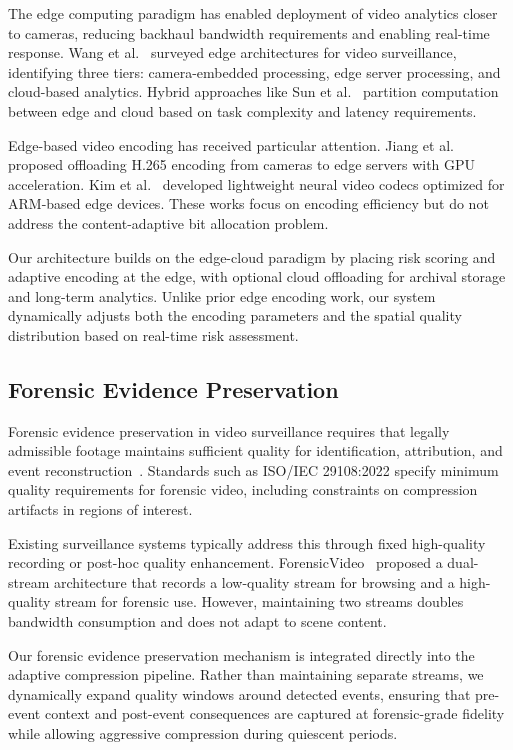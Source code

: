 The edge computing paradigm has enabled deployment of video analytics closer to cameras, reducing backhaul bandwidth requirements and enabling real-time response. Wang et al.~\cite{wang2024edge} surveyed edge architectures for video surveillance, identifying three tiers: camera-embedded processing, edge server processing, and cloud-based analytics. Hybrid approaches like Sun et al.~\cite{sun2023hybrid} partition computation between edge and cloud based on task complexity and latency requirements.

Edge-based video encoding has received particular attention. Jiang et al.~\cite{jiang2023edge} proposed offloading H.265 encoding from cameras to edge servers with GPU acceleration. Kim et al.~\cite{kim2024lightweight} developed lightweight neural video codecs optimized for ARM-based edge devices. These works focus on encoding efficiency but do not address the content-adaptive bit allocation problem.

Our architecture builds on the edge-cloud paradigm by placing risk scoring and adaptive encoding at the edge, with optional cloud offloading for archival storage and long-term analytics. Unlike prior edge encoding work, our system dynamically adjusts both the encoding parameters and the spatial quality distribution based on real-time risk assessment.

\subsection{Forensic Evidence Preservation}

Forensic evidence preservation in video surveillance requires that legally admissible footage maintains sufficient quality for identification, attribution, and event reconstruction~\cite{ISO2022forensic}. Standards such as ISO/IEC 29108:2022 specify minimum quality requirements for forensic video, including constraints on compression artifacts in regions of interest.

Existing surveillance systems typically address this through fixed high-quality recording or post-hoc quality enhancement. ForensicVideo~\cite{mitchell2020forensic} proposed a dual-stream architecture that records a low-quality stream for browsing and a high-quality stream for forensic use. However, maintaining two streams doubles bandwidth consumption and does not adapt to scene content.

Our forensic evidence preservation mechanism is integrated directly into the adaptive compression pipeline. Rather than maintaining separate streams, we dynamically expand quality windows around detected events, ensuring that pre-event context and post-event consequences are captured at forensic-grade fidelity while allowing aggressive compression during quiescent periods.

